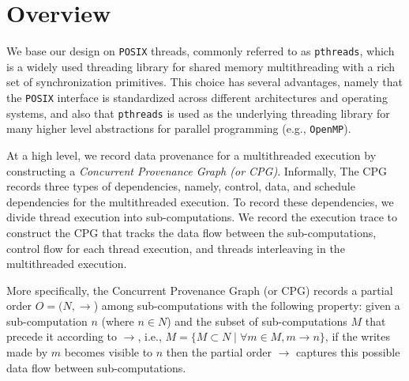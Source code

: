 \section{Overview}
\label{sec:overview}
%

We base our design on {\tt POSIX} threads, commonly referred to as
{\tt pthreads}, which is a widely used threading library for shared memory
multithreading with a rich set of synchronization primitives.  This
choice has several advantages, namely that the {\tt POSIX} interface
is standardized across different architectures and operating systems, and also that {\tt pthreads} is used as the underlying threading
library for many higher level abstractions for parallel programming
(e.g., {\tt OpenMP}).




 At a high level, we record data provenance for a multithreaded execution by constructing a {\em Concurrent Provenance Graph (or CPG)}. Informally,  The CPG records three types of dependencies, namely, control, data, and schedule dependencies for the multithreaded execution. To record these dependencies, we divide thread execution into sub-computations. We record the execution trace to construct the CPG that tracks the data flow between the sub-computations, control flow for each thread execution, and threads interleaving  in the multithreaded execution.

More specifically, the Concurrent Provenance Graph (or CPG) records a partial order $O = (N, \rightarrow$) among sub-computations with the following property: given a sub-computation $n$ (where $n \in N $)  and the subset of sub-computations $M$ that precede it according to $\rightarrow$, i.e., $M = \{M \subset N \mid \forall m \in M, m \rightarrow n\}$, if the writes made by $m$ becomes visible to $n$ then the partial order $\rightarrow$ captures this possible data flow between sub-computations.




